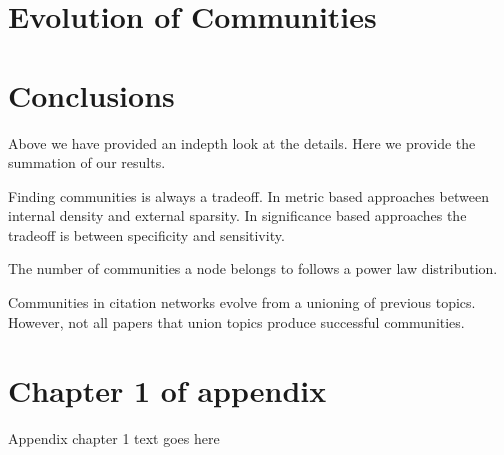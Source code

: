 \documentclass[phd,tocprelim]{cornell}
\begin{document}
\chapter{Evolution of Communities}


\chapter{Conclusions}

Above we have provided an indepth look at the details.  Here we provide the summation of our results.

Finding communities is always a tradeoff.  In metric based approaches between internal density and external sparsity.  In significance based approaches the tradeoff is between specificity and sensitivity.

The number of communities a node belongs to follows a power law distribution.

Communities in citation networks evolve from a unioning of previous topics.  However, not all papers that union topics produce successful communities.

\cite{fort}
\cite{porter}
\cite{kanna}
\cite{newman}
\cite{duch}
\cite{blondel}
\cite{mishra}
\cite{jain}
\cite{zhang}
\cite{andersen}
\cite{capocci}
\cite{lanc:2009}
\cite{danon}
\cite{leskovec}
\cite{hui}
\cite{maiya}
\cite{lan:2008}
\cite{hastings}
\cite{leskovec:2008}
\cite{chen}
\cite{lanc:2010}
\cite{girvan}


\appendix
\chapter{Chapter 1 of appendix}
Appendix chapter 1 text goes here


\end{document}

